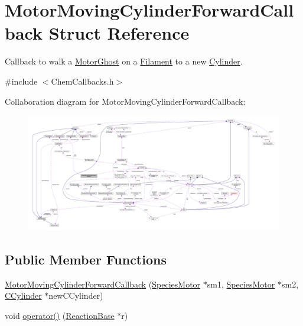 \hypertarget{structMotorMovingCylinderForwardCallback}{\section{Motor\+Moving\+Cylinder\+Forward\+Callback Struct Reference}
\label{structMotorMovingCylinderForwardCallback}
}


Callback to walk a \hyperlink{classMotorGhost}{Motor\+Ghost} on a \hyperlink{classFilament}{Filament} to a new \hyperlink{classCylinder}{Cylinder}.  




{\ttfamily \#include $<$Chem\+Callbacks.\+h$>$}



Collaboration diagram for Motor\+Moving\+Cylinder\+Forward\+Callback\+:
\nopagebreak
\begin{figure}[H]
\begin{center}
\leavevmode
\includegraphics[width=350pt]{structMotorMovingCylinderForwardCallback__coll__graph}
\end{center}
\end{figure}
\subsection*{Public Member Functions}
\begin{DoxyCompactItemize}
\item 
\hyperlink{structMotorMovingCylinderForwardCallback_a53e91b08cc575dd3d9ee154f2b6e07fb}{Motor\+Moving\+Cylinder\+Forward\+Callback} (\hyperlink{classSpeciesMotor}{Species\+Motor} $\ast$sm1, \hyperlink{classSpeciesMotor}{Species\+Motor} $\ast$sm2, \hyperlink{classCCylinder}{C\+Cylinder} $\ast$new\+C\+Cylinder)
\item 
void \hyperlink{structMotorMovingCylinderForwardCallback_a2b4b90a88f016b07e2d42589b456aab4}{operator()} (\hyperlink{classReactionBase}{Reaction\+Base} $\ast$r)
\end{DoxyCompactItemize}

